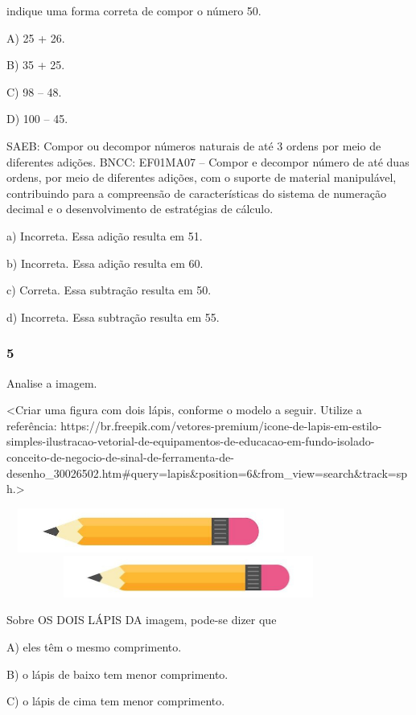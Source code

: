 indique uma forma correta de compor o número 50.

A) 25 + 26.

B) 35 + 25.

C) 98 -- 48.

D) 100 -- 45.

SAEB: Compor ou decompor números naturais de até 3 ordens por
meio de diferentes adições.
BNCC: EF01MA07 -- Compor e decompor número de até duas ordens, por meio
de diferentes adições, com o suporte de material manipulável,
contribuindo para a compreensão de características do sistema de
numeração decimal e o desenvolvimento de estratégias de cálculo.

a) Incorreta. Essa adição resulta em 51.

b) Incorreta. Essa adição resulta em 60.

c) Correta. Essa subtração resulta em 50.

d) Incorreta. Essa subtração resulta em 55.

\subsubsection{5}\label{section-91}

Analise a imagem.

\textless{}Criar uma figura com dois lápis, conforme o modelo a seguir.
Utilize a referência:
https://br.freepik.com/vetores-premium/icone-de-lapis-em-estilo-simples-ilustracao-vetorial-de-equipamentos-de-educacao-em-fundo-isolado-conceito-de-negocio-de-sinal-de-ferramenta-de-desenho\_30026502.htm\#query=lapis\&position=6\&from\_view=search\&track=sph.\textgreater{}

\includegraphics[width=3.74118in,height=0.57310in]{media/image29.jpg}\includegraphics[width=4.71287in,height=0.53673in]{media/image29.jpg}

Sobre OS DOIS LÁPIS DA imagem, pode-se dizer que

A) eles têm o mesmo comprimento.

B) o lápis de baixo tem menor comprimento.

C) o lápis de cima tem menor comprimento.

